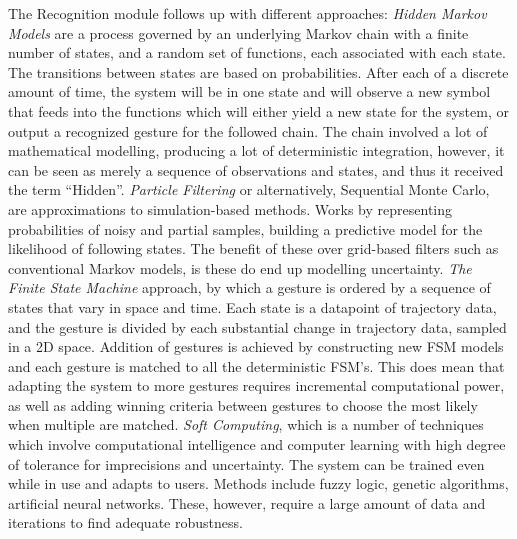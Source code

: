     The Recognition module follows up with different approaches: \emph{Hidden Markov Models} are a process governed by an underlying Markov chain with a finite number of states, and a random set of functions, each associated with each state. The transitions between states are based on probabilities. After each of a discrete amount of time, the system will be in one state and will observe a new symbol that feeds into the functions which will either yield a new state for the system, or output a recognized gesture for the followed chain. The chain involved a lot of mathematical modelling, producing a lot of deterministic integration, however, it can be seen as merely a sequence of observations and states, and thus it received the term “Hidden”. \emph{Particle Filtering} or alternatively, Sequential Monte Carlo, are approximations to simulation-based methods. Works by representing probabilities of noisy and partial samples, building a predictive model for the likelihood of following states. The benefit of these over grid-based filters such as conventional Markov models, is these do end up modelling uncertainty. \emph{The Finite State Machine} approach, by which a gesture is ordered by a sequence of states that vary in space and time. Each state is a datapoint of trajectory data, and the gesture is divided by each substantial change in trajectory data, sampled in a 2D space. Addition of gestures is achieved by constructing new FSM models and each gesture is matched to all the deterministic FSM’s. This does mean that adapting the system to more gestures requires incremental computational power, as well as adding winning criteria between gestures to choose the most likely when multiple are matched. \emph{Soft Computing}, which is a number of techniques which involve computational intelligence and computer learning with high degree of tolerance for imprecisions and uncertainty. The system can be trained even while in use and adapts to users. Methods include fuzzy logic, genetic algorithms, artificial neural networks. These, however, require a large amount of data and iterations to find adequate robustness.
